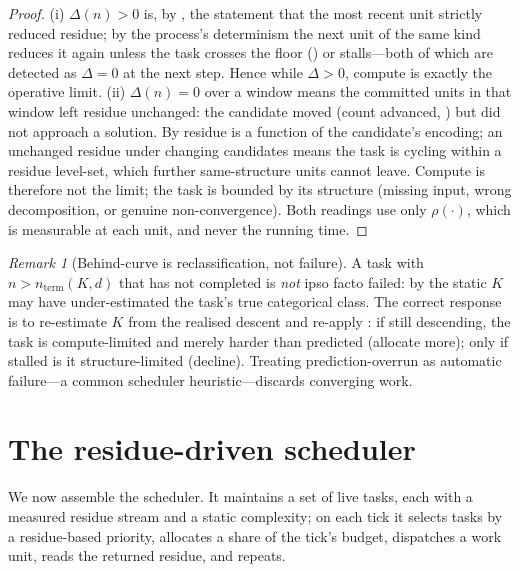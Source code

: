 \documentclass[twocolumn,10pt,a4paper]{article}
\theoremstyle{thmstyle}
\theoremstyle{definition}
\theoremstyle{remark}
\newtheorem{remark}[theorem]{Remark}
\newcommand{\res}{\rho}
\begin{document}
\begin{proof}
(i) $\Delta(n)>0$ is, by , the statement that the most
recent unit strictly reduced residue; by the process's determinism the
next unit of the same kind reduces it again unless the task crosses the
floor () or stalls---both of which are detected as
$\Delta=0$ at the next step. Hence while $\Delta>0$, compute is exactly
the operative limit.
(ii) $\Delta(n)=0$ over a window means the committed units in that window
left residue unchanged: the candidate moved (count advanced,
) but did not approach a solution. By
 residue is a function of the candidate's encoding; an
unchanged residue under changing candidates means the task is cycling
within a residue level-set, which further same-structure units cannot
leave. Compute is therefore not the limit; the task is bounded by its
structure (missing input, wrong decomposition, or genuine
non-convergence). Both readings use only $\res(\cdot)$, which is
measurable at each unit, and never the running time.
\end{proof}

\begin{remark}[Behind-curve is reclassification, not failure]
\label{rem:reclassify}
A task with $n>n_{\mathrm{term}}(K,d)$ that has not completed is
\emph{not} ipso facto failed: by  the static $K$ may
have under-estimated the task's true categorical class. The correct
response is to re-estimate $K$ from the realised descent and re-apply
: if still descending, the task is compute-limited
and merely harder than predicted (allocate more); only if stalled is it
structure-limited (decline). Treating prediction-overrun as automatic
failure---a common scheduler heuristic---discards converging work.
\end{remark}

\section{The residue-driven scheduler}
\label{sec:scheduler}

We now assemble the scheduler. It maintains a set of live tasks, each
with a measured residue stream and a static complexity; on each tick it
selects tasks by a residue-based priority, allocates a share of the
tick's budget, dispatches a work unit, reads the returned residue, and
repeats.
\end{document}
